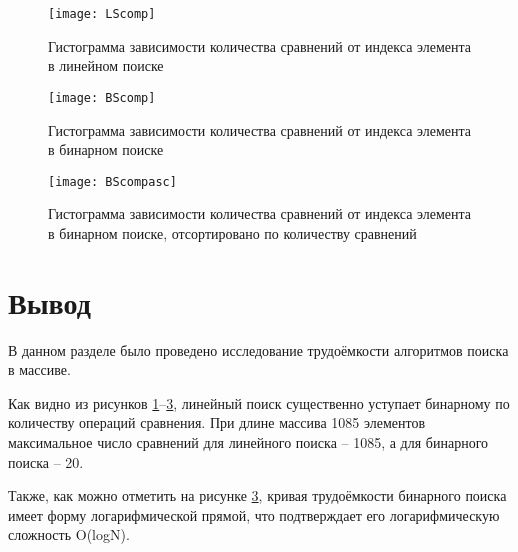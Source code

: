 \begin{figure}
	\centering
	\texttt{[image: LScomp]}
	\caption{Гистограмма зависимости количества сравнений от индекса элемента в линейном поиске}
	\label{fig:LScomp}
\end{figure}

\begin{figure}
	\centering
	\texttt{[image: BScomp]}
	\caption{Гистограмма зависимости количества сравнений от индекса элемента в бинарном поиске}
	\label{fig:BScomp}
\end{figure}

\begin{figure}
	\centering
	\texttt{[image: BScompasc]}
	\caption{Гистограмма зависимости количества сравнений от индекса элемента в бинарном поиске, отсортировано по количеству сравнений}
	\label{fig:BScompasc}
\end{figure}

\pagebreak

\section{Вывод}

В данном разделе было проведено исследование трудоёмкости алгоритмов поиска в массиве.

Как видно из рисунков \ref{fig:LScomp}–\ref{fig:BScompasc}, линейный поиск существенно уступает бинарному по количеству операций сравнения. При длине массива 1085 элементов максимальное число сравнений для линейного поиска – 1085, а для бинарного поиска – 20.

Также, как можно отметить на рисунке \ref{fig:BScompasc}, кривая трудоёмкости бинарного поиска имеет форму логарифмической прямой, что подтверждает его логарифмическую сложность O(logN).

\clearpage
